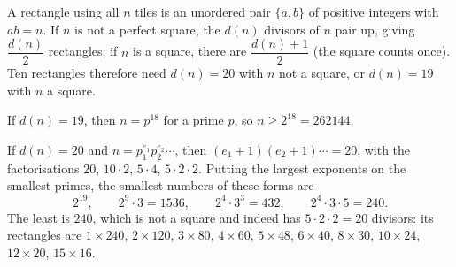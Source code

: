 A rectangle using all $n$ tiles is an unordered pair $\{a,b\}$ of positive integers with $ab=n$. If $n$ is not a perfect square, the $d(n)$ divisors of $n$ pair up, giving $\dfrac{d(n)}{2}$ rectangles; if $n$ is a square, there are $\dfrac{d(n)+1}{2}$ (the square counts once). Ten rectangles therefore need $d(n)=20$ with $n$ not a square, or $d(n)=19$ with $n$ a square.

If $d(n)=19$, then $n=p^{18}$ for a prime $p$, so $n\ge2^{18}=262144$.

If $d(n)=20$ and $n=p_1^{e_1}p_2^{e_2}\cdots$, then $(e_1+1)(e_2+1)\cdots=20$, with the factorisations $20$, $10\cdot2$, $5\cdot4$, $5\cdot2\cdot2$. Putting the largest exponents on the smallest primes, the smallest numbers of these forms are
\[2^{19},\qquad 2^9\cdot3=1536,\qquad 2^4\cdot3^3=432,\qquad 2^4\cdot3\cdot5=240 .\]
The least is $\boxed{240}$, which is not a square and indeed has $5\cdot2\cdot2=20$ divisors: its rectangles are $1\times240$, $2\times120$, $3\times80$, $4\times60$, $5\times48$, $6\times40$, $8\times30$, $10\times24$, $12\times20$, $15\times16$.
